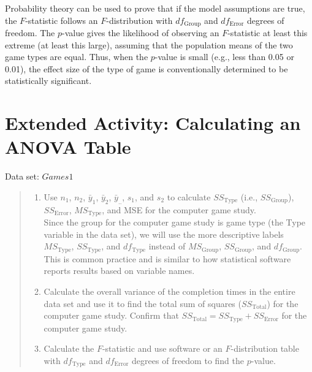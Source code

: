 \documentclass[
]{report}
\providecommand{\tightlist}{%
  \setlength{\itemsep}{0pt}\setlength{\parskip}{0pt}}
\begin{document}
Probability theory can be used to prove that if the model assumptions are true, the \(F\)-statistic follows an \(F\)-distribution with \(df_{\text{Group}}\) and \(df_{\text{Error}}\) degrees of freedom. The \(p\)-value gives the likelihood of observing an \(F\)-statistic at least this extreme (at least this large), assuming that the population means of the two game types are equal. Thus, when the \(p\)-value is small (e.g., less than 0.05 or 0.01), the effect size of the type of game is conventionally determined to be statistically significant.

\hypertarget{extended-activity-calculating-an-anova-table}{%
\section*{Extended Activity: Calculating an ANOVA Table}\label{extended-activity-calculating-an-anova-table}}

Data set: \(Games1\)

\begin{quote}
\begin{enumerate}
\def\labelenumi{\arabic{enumi}.}
\setcounter{enumi}{36}
\tightlist
\item
  Use \(n_1\), \(n_2\), \(\bar{y}_1\), \(\bar{y}_2\), \(\bar{y}_{..}\), \(s_1\), and \(s_2\) to calculate \(SS_{\text{Type}}\) (i.e., \(SS_{\text{Group}}\)), \(SS_{\text{Error}}\), \(MS_{\text{Type}}\), and MSE for the computer game study.\\
  Since the group for the computer game study is game type (the Type variable in the data set), we will use the more descriptive labels \(MS_{\text{Type}}\), \(SS_{\text{Type}}\), and \(df_{\text{Type}}\) instead of \(MS_{\text{Group}}\), \(SS_{\text{Group}}\), and \(df_{\text{Group}}\). This is common practice and is similar to how statistical software reports results based on variable names.
\item
  Calculate the overall variance of the completion times in the entire data set and use it to find the total sum of squares (\(SS_{\text{Total}}\)) for the computer game study. Confirm that \(SS_{\text{Total}} = SS_{\text{Type}} + SS_{\text{Error}}\) for the computer game study.
\item
  Calculate the \(F\)-statistic and use software or an \(F\)-distribution table with \(df_{\text{Type}}\) and \(df_{\text{Error}}\) degrees of freedom to find the \(p\)-value.
\end{enumerate}
\end{quote}
\end{document}
